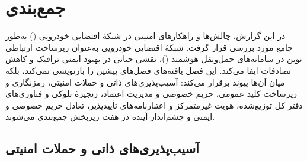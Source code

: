 \documentclass[12pt,a4paper]{article}
\begin{document}

\section{جمع‌بندی}

در این گزارش، چالش‌ها و راهکار‌های امنیتی در شبکهٔ اقتضایی خودرویی () به‌طور جامع مورد بررسی قرار گرفت. شبکهٔ اقتضایی خودرویی به‌عنوان زیرساخت ارتباطی نوین در سامانه‌های حمل‌ونقل هوشمند ()، نقشی حیاتی در بهبود ایمنی ترافیک و کاهش تصادفات ایفا می‌کند. این فصل یافته‌های فصل‌های پیشین را بازنویسی نمی‌کند، بلکه میان آن‌ها پیوند برقرار می‌کند: آسیب‌پذیری‌های ذاتی و حملات امنیتی، رمزنگاری و زیرساخت کلید عمومی، حریم خصوصی و مدیریت اعتماد، زنجیرهٔ بلوکی و فناوری‌های دفتر کل توزیع‌شده، هویت غیرمتمرکز و اعتبارنامه‌های تأییدپذیر، تعادل حریم خصوصی و ایمنی و چشم‌انداز آینده در هفت زیربخش جمع‌بندی می‌شوند.

\subsection{آسیب‌پذیری‌های ذاتی و حملات امنیتی}
\end{document}
